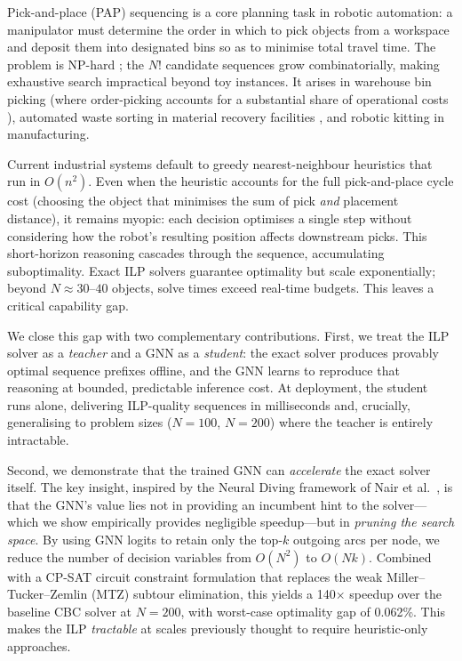 \documentclass[conference]{IEEEtran}
\begin{document}
Pick-and-place (PAP) sequencing is a core planning task in robotic automation: a manipulator must determine the order in which to pick objects from a workspace and deposit them into designated bins so as to minimise total travel time. The problem is NP-hard \cite{chalasani1996}; the $N!$ candidate sequences grow combinatorially, making exhaustive search impractical beyond toy instances. It arises in warehouse bin picking (where order-picking accounts for a substantial share of operational costs \cite{cheng2024drl}), automated waste sorting in material recovery facilities \cite{gundupalli2021sequence, kiyokawa2024challenges}, and robotic kitting in manufacturing.

Current industrial systems default to greedy nearest-neighbour heuristics that run in $O(n^2)$. Even when the heuristic accounts for the full pick-and-place cycle cost (choosing the object that minimises the sum of pick \emph{and} placement distance), it remains myopic: each decision optimises a single step without considering how the robot's resulting position affects downstream picks. This short-horizon reasoning cascades through the sequence, accumulating suboptimality. Exact ILP solvers guarantee optimality but scale exponentially; beyond $N \approx 30$--$40$ objects, solve times exceed real-time budgets. This leaves a critical capability gap.

We close this gap with two complementary contributions. First, we treat the ILP solver as a \emph{teacher} and a GNN as a \emph{student}: the exact solver produces provably optimal sequence prefixes offline, and the GNN learns to reproduce that reasoning at bounded, predictable inference cost. At deployment, the student runs alone, delivering ILP-quality sequences in milliseconds and, crucially, generalising to problem sizes ($N{=}100$, $N{=}200$) where the teacher is entirely intractable.

Second, we demonstrate that the trained GNN can \emph{accelerate} the exact solver itself. The key insight, inspired by the Neural Diving framework of Nair et al.\ \cite{nair2021neural}, is that the GNN's value lies not in providing an incumbent hint to the solver---which we show empirically provides negligible speedup---but in \emph{pruning the search space}. By using GNN logits to retain only the top-$k$ outgoing arcs per node, we reduce the number of decision variables from $O(N^2)$ to $O(Nk)$. Combined with a CP-SAT circuit constraint formulation \cite{ortools} that replaces the weak Miller--Tucker--Zemlin (MTZ) subtour elimination, this yields a 140$\times$ speedup over the baseline CBC solver at $N{=}200$, with worst-case optimality gap of 0.062\%. This makes the ILP \emph{tractable} at scales previously thought to require heuristic-only approaches.
\end{document}
